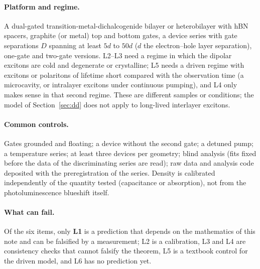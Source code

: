 \documentclass[11pt,a4paper]{article}
\begin{document}
\paragraph{Platform and regime.} A dual-gated transition-metal-dichalcogenide bilayer or heterobilayer with hBN spacers, graphite
(or metal) top and bottom gates, a device series with gate separations $D$ spanning at least $5d$ to $50d$ ($d$ the electron--hole
layer separation), one-gate and two-gate versions. L2--L3 need a regime in which the dipolar excitons are cold and degenerate
or crystalline; L5 needs a driven regime with excitons or polaritons of lifetime short compared with the observation time (a
microcavity, or intralayer excitons under continuous pumping), and L4 only makes sense in that second regime. These are different
samples or conditions; the model of Section~\ref{sec:dd} does not apply to long-lived interlayer excitons.

\paragraph{Common controls.} Gates grounded and floating; a device without the second gate; a detuned pump; a temperature series;
at least three devices per geometry; blind analysis (fits fixed before the data of the discriminating series are read); raw data
and analysis code deposited with the preregistration of the series. Density is calibrated independently of the quantity
tested (capacitance or absorption), not from the photoluminescence blueshift itself.

\paragraph{What can fail.} Of the six items, only \textbf{L1} is a prediction that depends on the mathematics of this note and can
be falsified by a measurement; L2 is a calibration, L3 and L4 are consistency checks that cannot falsify the theorem, L5 is a
textbook control for the driven model, and L6 has no prediction yet.
\end{document}
